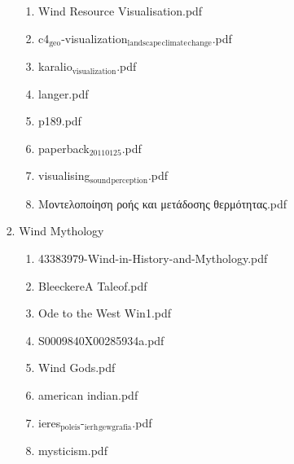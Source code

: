 \documentclass[11pt]{article}
\begin{document}
\begin{enumerate}
\begin{enumerate}
\begin{enumerate}
\begin{enumerate}
\begin{enumerate}
\item Wind Resource Visualisation.pdf
\label{sec-1-1-1-1-7-3-47-11}

\item c4$_{\text{geo}}$-visualization$_{\text{landscape}}$$_{\text{climate}}$$_{\text{change}}$.pdf
\label{sec-1-1-1-1-7-3-47-12}

\item karalio$_{\text{visualization}}$.pdf
\label{sec-1-1-1-1-7-3-47-13}

\item langer.pdf
\label{sec-1-1-1-1-7-3-47-14}

\item p189.pdf
\label{sec-1-1-1-1-7-3-47-15}

\item paperback$_{\text{20110125}}$.pdf
\label{sec-1-1-1-1-7-3-47-16}

\item visualising$_{\text{sound}}$$_{\text{perception}}$.pdf
\label{sec-1-1-1-1-7-3-47-17}

\item Μοντελοποίηση ροής και μετάδοσης θερμότητας.pdf
\label{sec-1-1-1-1-7-3-47-18}
\end{enumerate}

\item Wind Mythology
\label{sec-1-1-1-1-7-3-48}
\begin{enumerate}
\item 43383979-Wind-in-History-and-Mythology.pdf
\label{sec-1-1-1-1-7-3-48-1}

\item BleeckereA Taleof.pdf
\label{sec-1-1-1-1-7-3-48-2}

\item Ode to the West Win1.pdf
\label{sec-1-1-1-1-7-3-48-3}

\item S0009840X00285934a.pdf
\label{sec-1-1-1-1-7-3-48-4}

\item Wind Gods.pdf
\label{sec-1-1-1-1-7-3-48-5}

\item american indian.pdf
\label{sec-1-1-1-1-7-3-48-6}

\item ieres$_{\text{poleis}}$-$_{\text{ierh}}$$_{\text{gewgrafia}}$.pdf
\label{sec-1-1-1-1-7-3-48-7}

\item mysticism.pdf
\label{sec-1-1-1-1-7-3-48-8}


\end{enumerate}
\end{enumerate}
\end{enumerate}
\end{enumerate}
\end{enumerate}
\end{document}
